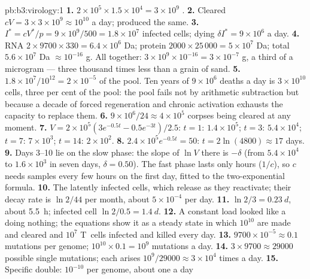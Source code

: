 \begin{solution}{pb:b3:virology:1}
\textbf{1.} $2\times 10^{5}\times 1.5\times 10^{4} = 3\times 10^{9}$
.
\textbf{2.} Cleared $cV = 3\times 3\times 10^{9} \approx 10^{10}$ a day;
produced the same.
\textbf{3.} $I^{*} = cV^{*}/p = 9\times 10^{9}/500 = 1.8\times 10^{7}$
infected cells; dying $\delta I^{*} = 9\times 10^{6}$ a day.
\textbf{4.} RNA $2\times 9700\times 330 = 6.4\times 10^{6}$ Da; protein
$2000\times 25\,000 = 5\times 10^{7}$ Da; total $5.6\times 10^{7}$ Da
$\approx 10^{-16}$ g. All  together: $3\times 10^{9}\times
10^{-16} = 3\times 10^{-7}$ g, a third of a microgram --- three
thousand times less than a grain of sand.
\textbf{5.} $1.8\times 10^{7}/10^{12} = 2\times 10^{-5}$ of the pool.
Ten years of $9\times 10^{6}$ deaths a day is $3\times 10^{10}$ cells,
three per cent of the pool: the pool fails not by arithmetic
subtraction but because a decade of forced regeneration and chronic
activation exhausts the capacity to replace them.
\textbf{6.} $9\times 10^{6}/24 \approx 4\times 10^{5}$ corpses being
cleared at any moment.
\textbf{7.} $V = 2\times 10^{5}(3e^{-0.5t} - 0.5e^{-3t})/2.5$: $t = 1$:
$1.4\times 10^{5}$; $t = 3$: $5.4\times 10^{4}$; $t = 7$: $7\times
10^{3}$; $t = 14$: $2\times 10^{2}$.
\textbf{8.} $2.4\times 10^{5}e^{-0.5t} = 50$: $t = 2\ln(4800) \approx 17$
days.
\textbf{9.} Days 3--10 lie on the slow phase: the slope of $\ln V$ there is
$-\delta$ (from $5.4\times 10^{4}$ to $1.6\times 10^{3}$ in seven days,
$\delta = 0.50$). The fast phase lasts only hours ($1/c$), so $c$ needs
samples every few hours on the first day, fitted to the two-exponential
formula.
\textbf{10.} The latently infected cells, which release  as they
reactivate; their decay rate is $\ln 2/44$ per month, about
$5\times 10^{-4}$ per day.
\textbf{11.}  $\ln 2/3 = \qty{0.23}{d}$, about \qty{5.5}{h}; infected
cell $\ln 2/0.5 = \qty{1.4}{d}$.
\textbf{12.} A constant load looked like a  doing nothing; the
equations show it as a steady state in which $10^{10}$  are made
and cleared and $10^{7}$ T~cells infected and killed every day.
\textbf{13.} $9700\times 10^{-5} \approx 0.1$ mutations per genome;
$10^{10}\times 0.1 = 10^{9}$ mutations a day.
\textbf{14.} $3\times 9700 \approx \num{29000}$ possible single mutations;
each arises $10^{9}/\num{29000} \approx 3\times 10^{4}$ times a day.
\textbf{15.} Specific double: $10^{-10}$ per genome, about one a day

\end{solution}
